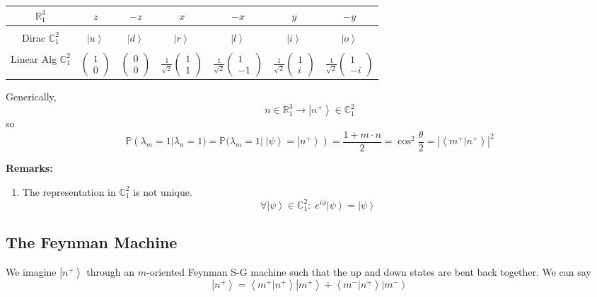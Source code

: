 \documentclass[12pt]{article}
\renewcommand{\P}{\mathbb{P}}
\newcommand{\R}{\mathbb{R}}
\newcommand{\brak}[1]{\left\langle #1 \right\rangle}
\newcommand{\C}{\mathbb{C}}
\newcommand{\ket}[1]{\left\vert #1 \right\rangle}
\begin{document}
\begin{center}
    \begin{tabular*}{5.24in}{|c|cccccc|}
        \hline
        $\R_1^3$ & $z$ & $-z$ & $x$ & $-x$ & $y$ & $-y$\\
        \hline
        &&&&&&\\
        Dirac $\C_1^2$ & $\ket{u}$ & $\ket{d}$& $\ket{r}$& $\ket{l}$& $\ket{i}$& $\ket{o}$\\
        &&&&&&\\
        Linear Alg $\C_1^2$ & $\begin{pmatrix}
            1\\0
        \end{pmatrix}$ & $\begin{pmatrix}
            0\\0
        \end{pmatrix}$& $\frac{1}{\sqrt 2}\begin{pmatrix}
            1\\1
        \end{pmatrix}$& $\frac{1}{\sqrt 2}\begin{pmatrix}
            1\\-1
        \end{pmatrix}$& $\frac{1}{\sqrt 2}\begin{pmatrix}
            1\\i
        \end{pmatrix}$& $\frac{1}{\sqrt 2}\begin{pmatrix}
            1\\-i
        \end{pmatrix}$\\
        \hline
    \end{tabular*}
\end{center}


Generically, 
\[n \in \R_1^3 \to \ket{n^+} \in \C_1^2\]
so 
\[\P(\lambda_m = 1 | \lambda_n = 1) = \P(\lambda_m = 1 | \; \ket{\psi} = \ket{n^+}) = \frac{1+ m\cdot n}{2} = \cos^2 \frac{\theta}{2} = |\brak{m^+ | n^+}|^2\]

\textbf{Remarks:}
\begin{enumerate}
    \item The representation in $\C_1^2$ is not unique. 
    \[\forall \ket{\psi} \in \C_1^2:\; e^{i\phi}\ket{\psi} = \ket{\psi}\]
\end{enumerate}

\subsection*{The Feynman Machine}
We imagine $\ket{n^+}$ through an $m$-oriented Feynman S-G machine such that the up and down states are bent back together. We can say 
\[\ket{n^+} = \brak{m^+ | n^+} \ket{m^+} + \brak{m^- | n^+}\ket{m^-}\]
\end{document}

